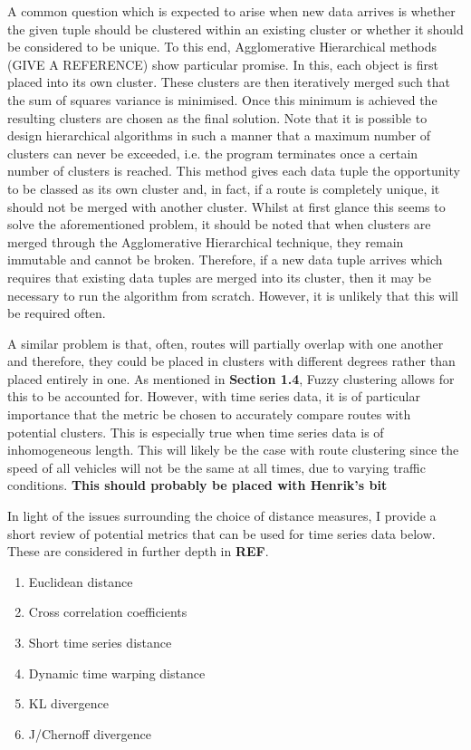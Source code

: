 \documentclass{report}
\begin{document}
    A common question which is expected to arise when new data arrives is whether the given tuple should be clustered within an existing cluster or whether it should be considered to be unique. To this end, Agglomerative Hierarchical methods (GIVE A REFERENCE) show particular promise. In this, each object is first placed into its own cluster. These clusters are then iteratively merged such that the sum of squares variance is minimised. Once this minimum is achieved the resulting clusters are chosen as the final solution. Note that it is possible to design hierarchical algorithms in such a manner that a maximum number of clusters can never be exceeded, i.e. the program terminates once a certain number of clusters is reached. This method gives each data tuple the opportunity to be classed as its own cluster and, in fact, if a route is completely unique, it should not be merged with another cluster. Whilst at first glance this seems to solve the aforementioned problem, it should be noted that when clusters are merged through the Agglomerative Hierarchical technique, they remain immutable and cannot be broken. Therefore, if a new data tuple arrives which requires that existing data tuples are merged into its cluster, then it may be necessary to run the algorithm from scratch. However, it is unlikely that this will be required often.

    A similar problem is that, often, routes will partially overlap with one another and therefore, they could be placed in clusters with different degrees rather than placed entirely in one. As mentioned in \textbf{Section 1.4}, Fuzzy clustering allows for this to be accounted for. However, with time series data, it is of particular importance that the metric be chosen to accurately compare routes with potential clusters. This is especially true when time series data is of inhomogeneous length. This will likely be the case with route clustering since the speed of all vehicles will not be the same at all times, due to varying traffic conditions. \textbf{This should probably be placed with Henrik's bit}

    In light of the issues surrounding the choice of distance measures, I provide a short review of potential metrics that can be used for time series data below. These are considered in further depth in \textbf{REF}.

    \begin{enumerate}
        \item Euclidean distance
        \item Cross correlation coefficients
        \item Short time series distance
        \item Dynamic time warping distance
        \item KL divergence
        \item J/Chernoff divergence
    \end{enumerate}
\end{document}
